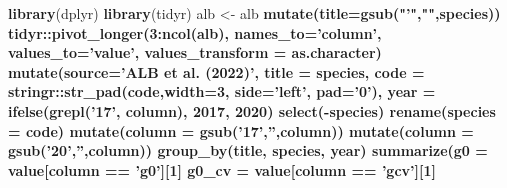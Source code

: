 \documentclass[
]{book}
\newenvironment{Shaded}{\begin{snugshade}}{\end{snugshade}}
\newcommand{\DataTypeTok}[1]{\textcolor[rgb]{0.13,0.29,0.53}{#1}}
\newcommand{\DecValTok}[1]{\textcolor[rgb]{0.00,0.00,0.81}{#1}}
\newcommand{\KeywordTok}[1]{\textcolor[rgb]{0.13,0.29,0.53}{\textbf{#1}}}
\newcommand{\NormalTok}[1]{#1}
\newcommand{\OperatorTok}[1]{\textcolor[rgb]{0.81,0.36,0.00}{\textbf{#1}}}
\newcommand{\StringTok}[1]{\textcolor[rgb]{0.31,0.60,0.02}{#1}}
\begin{document}
\begin{Shaded}
\begin{Highlighting}[]
\KeywordTok{library}\NormalTok{(dplyr)}
\KeywordTok{library}\NormalTok{(tidyr)}
\NormalTok{alb <-}
\StringTok{    }\NormalTok{alb }\OperatorTok{%
\StringTok{    }\KeywordTok{mutate}\NormalTok{(}\DataTypeTok{title=}\KeywordTok{gsub}\NormalTok{(}\StringTok{"'"}\NormalTok{,}\StringTok{""}\NormalTok{,species)) }\OperatorTok{%
\StringTok{    }\NormalTok{tidyr}\OperatorTok{::}\KeywordTok{pivot_longer}\NormalTok{(}\DecValTok{3}\OperatorTok{:}\KeywordTok{ncol}\NormalTok{(alb),}
                        \DataTypeTok{names_to=}\StringTok{'column'}\NormalTok{,}
                        \DataTypeTok{values_to=}\StringTok{'value'}\NormalTok{,}
                        \DataTypeTok{values_transform =}\NormalTok{ as.character) }\OperatorTok{%
\StringTok{    }\KeywordTok{mutate}\NormalTok{(}\DataTypeTok{source=}\StringTok{'ALB et al. (2022)'}\NormalTok{,}
           \DataTypeTok{title =}\NormalTok{ species,}
           \DataTypeTok{code =}\NormalTok{ stringr}\OperatorTok{::}\KeywordTok{str_pad}\NormalTok{(code,}\DataTypeTok{width=}\DecValTok{3}\NormalTok{, }\DataTypeTok{side=}\StringTok{'left'}\NormalTok{, }\DataTypeTok{pad=}\StringTok{'0'}\NormalTok{),}
           \DataTypeTok{year =} \KeywordTok{ifelse}\NormalTok{(}\KeywordTok{grepl}\NormalTok{(}\StringTok{'17'}\NormalTok{, column), }\DecValTok{2017}\NormalTok{, }\DecValTok{2020}\NormalTok{) }\OperatorTok{%
\StringTok{    }\KeywordTok{select}\NormalTok{(}\OperatorTok{-}\NormalTok{species) }\OperatorTok{%
\StringTok{    }\KeywordTok{rename}\NormalTok{(}\DataTypeTok{species =}\NormalTok{ code) }\OperatorTok{%
\StringTok{    }\KeywordTok{mutate}\NormalTok{(}\DataTypeTok{column =} \KeywordTok{gsub}\NormalTok{(}\StringTok{'17'}\NormalTok{,}\StringTok{''}\NormalTok{,column)) }\OperatorTok{%
\StringTok{    }\KeywordTok{mutate}\NormalTok{(}\DataTypeTok{column =} \KeywordTok{gsub}\NormalTok{(}\StringTok{'20'}\NormalTok{,}\StringTok{''}\NormalTok{,column)) }\OperatorTok{%
\StringTok{    }\KeywordTok{group_by}\NormalTok{(title, species, year) }\OperatorTok{%
\StringTok{    }\KeywordTok{summarize}\NormalTok{(}\DataTypeTok{g0 =}\NormalTok{ value[column }\OperatorTok{==}\StringTok{ 'g0'}\NormalTok{][}\DecValTok{1}\NormalTok{] }\OperatorTok{%
              \DataTypeTok{g0_cv =}\NormalTok{ value[column }\OperatorTok{==}\StringTok{ 'gcv'}\NormalTok{][}\DecValTok{1}\NormalTok{] }\OperatorTok{%
}}}}}}}}}}}
\end{Highlighting}
\end{Shaded}
\end{document}
